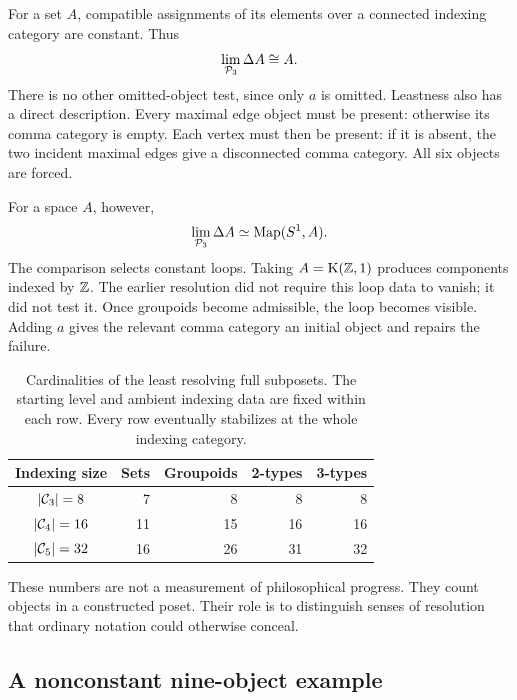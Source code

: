 For a set $A$, compatible assignments of its elements over a connected
indexing category are constant. Thus
\[
\operatorname*{lim}_{\mathcal P_3}\Delta A\cong A.
\]
There is no other omitted-object test, since only $a$ is omitted. Leastness
also has a direct description. Every maximal edge object must be present:
otherwise its comma category is empty. Each vertex must then be present:
if it is absent, the two incident maximal edges give a disconnected comma
category. All six objects are forced.

For a space $A$, however,
\[
\operatorname*{lim}_{\mathcal P_3}\Delta A\simeq\operatorname{Map}(S^1,A).
\]
The comparison selects constant loops. Taking $A=\mathrm K(\mathbb Z,1)$ produces
components indexed by $\mathbb Z$. The earlier resolution did not require this
loop data to vanish; it did not test it. Once groupoids become admissible,
the loop becomes visible. Adding $a$ gives the relevant comma category an
initial object and repairs the failure.

\begin{table}[htbp]
\centering
\begin{tabular}{@{}crrrr@{}}
\toprule
Indexing size & Sets & Groupoids & 2-types & 3-types\\
\midrule
$|\mathcal C_3|=8$  &7&8&8&8\\
$|\mathcal C_4|=16$ &11&15&16&16\\
$|\mathcal C_5|=32$ &16&26&31&32\\
\bottomrule
\end{tabular}
\caption{Cardinalities of the least resolving full subposets. The starting
level and ambient indexing data are fixed within each row. Every row
eventually stabilizes at the whole indexing category.}
\label{tab:profiles}
\end{table}

These numbers are not a measurement of philosophical progress. They count
objects in a constructed poset. Their role is to distinguish senses of
resolution that ordinary notation could otherwise conceal.

\subsection{A nonconstant nine-object example}\label{sec:nonconstant}

